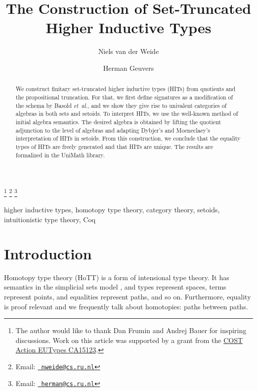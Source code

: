 \documentclass[9pt]{entcs}
\newcommand{\etal}{\emph{et~al.}}
\newcommand{\0}{\textbf{0}} %
\begin{document}
\begin{frontmatter}
  \title{The Construction of Set-Truncated Higher Inductive Types} \author{Niels van der Weide
		}
  \address{Institute for Computation and Information Sciences\\ Radboud Universiteit\\
  	Nijmegen, The Netherlands}
  \author{Herman Geuvers}
  \address{Institute for Computation and Information Sciences\\ Radboud Universiteit\\
  	Nijmegen, The Netherlands}
  \thanks[ALL]{The author would like to thank Dan Frumin and Andrej Bauer for inspiring discussions. Work on this article was supported by a grant from the \href{https://eutypes.cs.ru.nl/}{COST Action EUTypes CA15123}.} \thanks[myemail]{Email:
  	\href{mailto:nweide@cs.ru.nl} {\texttt{\normalshape
  			nweide@cs.ru.nl}}} \thanks[coemail]{Email:
  	\href{mailto:herman@cs.ru.nl} {\texttt{\normalshape
  			herman@cs.ru.nl}}}
\begin{abstract} 
  We construct finitary set-truncated higher inductive types (HITs) from quotients and the propositional truncation.
  For that, we first define signatures as a modification of the schema by Basold \etal, and we show they give rise to univalent categories of algebras in both sets and setoids.
  To interpret HITs, we use the well-known method of initial algebra semantics.
  The desired algebra is obtained by lifting the quotient adjunction to the level of algebras and adapting Dybjer's and Moeneclaey's interpretation of HITs in setoids.
  From this construction, we conclude that the equality types of HITs are freely generated and that HITs are unique.
  The results are formalized in the UniMath library.
\end{abstract}
\begin{keyword}
higher inductive types, homotopy type theory, category theory, setoids, intuitionistic type theory, Coq
\end{keyword}
\end{frontmatter}
\section{Introduction}
\label{intro}
Homotopy type theory (HoTT) is a form of intensional type theory. 
It has semantics in the simplicial sets model \cite{simpset}, and types represent spaces, terms represent points, and equalities represent paths, and so on.
Furthermore, equality is proof relevant and we frequently talk about homotopies: paths between paths.
\end{document}
